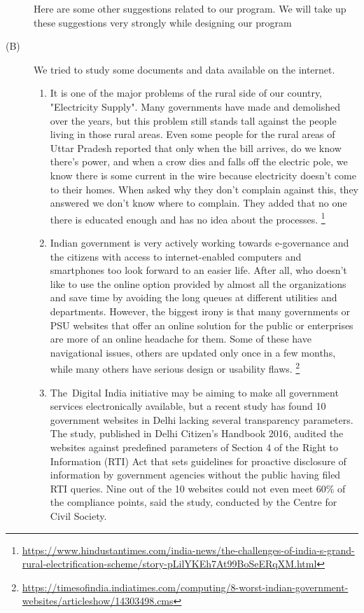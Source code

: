 \documentclass[acmtog]{acmart}
\begin{document}
\begin{description}
    Here are some other suggestions related to our program. We will take up these suggestions very strongly while designing our program

    \item[(B)] We tried to study some documents and data available on the internet.
    
    \begin{enumerate}
        \item It is one of the major problems of the rural side of our country, "Electricity Supply". Many governments have made and demolished over the years, but this problem still stands tall against the people living in those rural areas. Even some people for the rural areas of Uttar Pradesh reported that only when the bill arrives, do we know there's power, and when a crow dies and falls off the electric pole, we know there is some current in the wire because electricity doesn't come to their homes. When asked why they don't complain against this, they answered we don't know where to complain. They added that no one there is educated enough and has no idea about the processes.
        \footnote[1]{\url{https://www.hindustantimes.com/india-news/the-challenges-of-india-s-grand-rural-electrification-scheme/story-pLilYKEh7At99BoSeERqXM.html}}
        \item Indian government is very actively working towards e-governance and the citizens with access to internet-enabled computers and smartphones too look forward to an easier life. After all, who doesn’t like to use the online option provided by almost all the organizations and save time by avoiding the long queues at different utilities and departments. However, the biggest irony is that many governments or PSU websites that offer an online solution for the public or enterprises are more of an online headache for them. Some of these have navigational issues, others are updated only once in a few months, while many others have serious design or usability flaws.
        \footnote[2]{\url{https://timesofindia.indiatimes.com/computing/8-worst-indian-government-websites/articleshow/14303498.cms}}
        \item The Digital India initiative may be aiming to make all government services electronically available, but a recent study has found 10 government websites in Delhi lacking several transparency parameters. The study, published in Delhi Citizen’s Handbook 2016, audited the websites against predefined parameters of Section 4 of the Right to Information (RTI) Act that sets guidelines for proactive disclosure of information by government agencies without the public having filed RTI queries. Nine out of the 10 websites could not even meet 60\% of the compliance points, said the study, conducted by the Centre for Civil Society.	

\end{enumerate}
\end{description}
\end{document}
